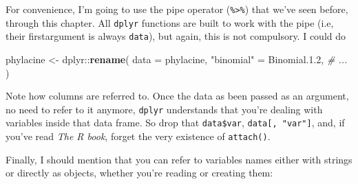 \documentclass[]{book}
\newenvironment{Shaded}{}{}
\newcommand{\CommentTok}[1]{\textcolor[rgb]{0.38,0.63,0.69}{\textit{#1}}}
\newcommand{\DataTypeTok}[1]{\textcolor[rgb]{0.56,0.13,0.00}{#1}}
\newcommand{\FloatTok}[1]{\textcolor[rgb]{0.25,0.63,0.44}{#1}}
\newcommand{\KeywordTok}[1]{\textcolor[rgb]{0.00,0.44,0.13}{\textbf{#1}}}
\newcommand{\NormalTok}[1]{#1}
\newcommand{\OperatorTok}[1]{\textcolor[rgb]{0.40,0.40,0.40}{#1}}
\newcommand{\StringTok}[1]{\textcolor[rgb]{0.25,0.44,0.63}{#1}}
\begin{document}
For convenience, I'm going to use the pipe operator (\texttt{\%\textgreater{}\%}) that we've seen
before, through this chapter. All \texttt{dplyr} functions are built to work with the
pipe (i.e, their firstargument is always \texttt{data}), but again, this is not
compulsory. I could do

\begin{Shaded}
\begin{Highlighting}[]
\NormalTok{phylacine <-}\StringTok{ }\NormalTok{dplyr}\OperatorTok{::}\KeywordTok{rename}\NormalTok{(}
  \DataTypeTok{data =}\NormalTok{ phylacine,}
  \StringTok{"binomial"}\NormalTok{ =}\StringTok{ }\NormalTok{Binomial.}\FloatTok{1.2}\NormalTok{,}
  \CommentTok{# ...}
\NormalTok{)}
\end{Highlighting}
\end{Shaded}

Note how columns are referred to. Once the data as been passed as an argument,
no need to refer to it anymore, \texttt{dplyr} understands that you're dealing with
variables inside that data frame. So drop that \texttt{data\$var}, \texttt{data{[},\ "var"{]}},
and, if you've read \emph{The R book}, forget the very existence of \texttt{attach()}.

Finally, I should mention that you can refer to variables names either with strings or directly as objects, whether you're reading or creating them:

\begin{Shaded}
\end{Shaded}
\end{document}
